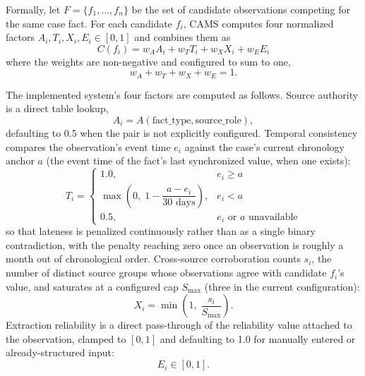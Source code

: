 \documentclass[conference]{IEEEtran}
\begin{document}
Formally, let $F = \{f_1, \dots, f_n\}$ be the set of candidate
observations competing for the same case fact. For each candidate $f_i$,
CAMS computes four normalized factors $A_i, T_i, X_i, E_i \in [0,1]$ and
combines them as
\begin{equation}
C(f_i) = w_A A_i + w_T T_i + w_X X_i + w_E E_i
\label{eq:score}
\end{equation}
where the weights are non-negative and configured to sum to one,
\begin{equation}
w_A + w_T + w_X + w_E = 1.
\label{eq:weights}
\end{equation}

The implemented system's four factors are computed as follows. Source
authority is a direct table lookup,
\begin{equation}
A_i = A(\text{fact\_type}, \text{source\_role}),
\label{eq:authority}
\end{equation}
defaulting to 0.5 when the pair is not explicitly configured. Temporal
consistency compares the observation's event time $e_i$ against the case's
current chronology anchor $a$ (the event time of the fact's last
synchronized value, when one exists):
\begin{equation}
T_i =
\begin{cases}
1.0, & e_i \ge a \\[2pt]
\max\!\left(0,\; 1 - \dfrac{a - e_i}{30\text{ days}}\right), & e_i < a \\[6pt]
0.5, & e_i \text{ or } a \text{ unavailable}
\end{cases}
\label{eq:temporal}
\end{equation}
so that lateness is penalized continuously rather than as a single binary
contradiction, with the penalty reaching zero once an observation is
roughly a month out of chronological order. Cross-source corroboration
counts $s_i$, the number of distinct source groups whose observations
agree with candidate $f_i$'s value, and saturates at a configured cap
$S_{\max}$ (three in the current configuration):
\begin{equation}
X_i = \min\!\left(1,\; \frac{s_i}{S_{\max}}\right).
\label{eq:corroboration}
\end{equation}
Extraction reliability is a direct pass-through of the reliability value
attached to the observation, clamped to $[0,1]$ and defaulting to 1.0 for
manually entered or already-structured input:
\begin{equation}
E_i \in [0,1].
\label{eq:extraction}
\end{equation}
\end{document}
